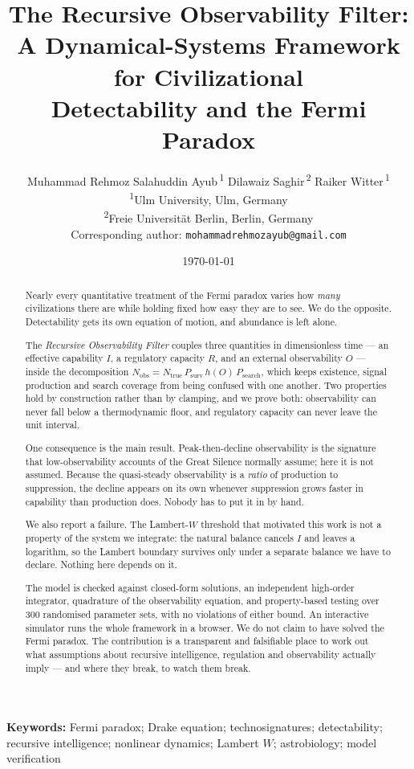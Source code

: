 \documentclass[11pt]{article}
\title{\bfseries The Recursive Observability Filter:\\
A Dynamical-Systems Framework for Civilizational\\ Detectability and the Fermi Paradox}
\author{%
  Muhammad Rehmoz Salahuddin Ayub\,\textsuperscript{1}\quad
  Dilawaiz Saghir\,\textsuperscript{2}\quad
  Raiker Witter\,\textsuperscript{1}\\[5pt]
  \small \textsuperscript{1}Ulm University, Ulm, Germany\\
  \small \textsuperscript{2}Freie Universit\"at Berlin, Berlin, Germany\\[3pt]
  \small Corresponding author: \texttt{mohammadrehmozayub@gmail.com}
}
\date{\today}
\newcommand{\Icap}{I}                 %
\newcommand{\Reg}{R}                  %
\newcommand{\Obs}{O}                  %
\newcommand{\Ntrue}{N_{\mathrm{true}}}
\newcommand{\Nobs}{N_{\mathrm{obs}}}
\newcommand{\Psurv}{P_{\mathrm{surv}}}
\newcommand{\Psearch}{P_{\mathrm{search}}}
\theoremstyle{plain}
\theoremstyle{definition}
\begin{document}
\maketitle

\begin{abstract}
\noindent
Nearly every quantitative treatment of the Fermi paradox varies how \emph{many}
civilizations there are while holding fixed how easy they are to see. We do the
opposite. Detectability gets its own equation of motion, and abundance is left
alone.

The \emph{Recursive Observability Filter} couples three quantities in
dimensionless time --- an effective capability $\Icap$, a regulatory capacity
$\Reg$, and an external observability $\Obs$ --- inside the decomposition
$\Nobs=\Ntrue\,\Psurv\,h(\Obs)\,\Psearch$, which keeps existence, signal
production and search coverage from being confused with one another. Two
properties hold by construction rather than by clamping, and we prove both:
observability can never fall below a thermodynamic floor, and regulatory
capacity can never leave the unit interval.

One consequence is the main result. Peak-then-decline observability is the
signature that low-observability accounts of the Great Silence normally assume;
here it is not assumed. Because the quasi-steady observability is a
\emph{ratio} of production to suppression, the decline appears on its own
whenever suppression grows faster in capability than production does. Nobody
has to put it in by hand.

We also report a failure. The Lambert-$W$ threshold that motivated this work is
not a property of the system we integrate: the natural balance cancels $\Icap$
and leaves a logarithm, so the Lambert boundary survives only under a separate
balance we have to declare. Nothing here depends on it.

The model is checked against closed-form solutions, an independent high-order
integrator, quadrature of the observability equation, and property-based testing
over 300 randomised parameter sets, with no violations of either bound. An
interactive simulator runs the whole framework in a browser. We do not claim to
have solved the Fermi paradox. The contribution is a transparent and falsifiable
place to work out what assumptions about recursive intelligence, regulation and
observability actually imply --- and where they break, to watch them break.
\end{abstract}

\noindent\textbf{Keywords:} Fermi paradox; Drake equation; technosignatures;
detectability; recursive intelligence; nonlinear dynamics; Lambert $W$;
astrobiology; model verification
\end{document}
